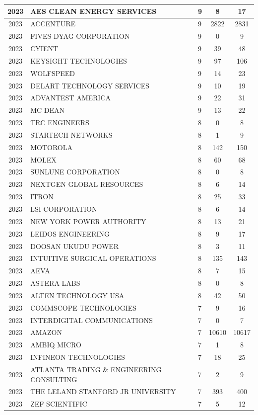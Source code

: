 \documentclass{article}%
\begin{document}
\begin{longtable}{c|p{20em}|p{5em}|c|c}
\hline%
2023&AES CLEAN ENERGY SERVICES&9&8&17\\%
\hline%
2023&ACCENTURE&9&2822&2831\\%
\hline%
2023&FIVES DYAG CORPORATION&9&0&9\\%
\hline%
2023&CYIENT&9&39&48\\%
\hline%
2023&KEYSIGHT TECHNOLOGIES&9&97&106\\%
\hline%
2023&WOLFSPEED&9&14&23\\%
\hline%
2023&DELART TECHNOLOGY SERVICES&9&10&19\\%
\hline%
2023&ADVANTEST AMERICA&9&22&31\\%
\hline%
2023&MC DEAN&9&13&22\\%
\hline%
2023&TRC ENGINEERS&8&0&8\\%
\hline%
2023&STARTECH NETWORKS&8&1&9\\%
\hline%
2023&MOTOROLA&8&142&150\\%
\hline%
2023&MOLEX&8&60&68\\%
\hline%
2023&SUNLUNE CORPORATION&8&0&8\\%
\hline%
2023&NEXTGEN GLOBAL RESOURCES&8&6&14\\%
\hline%
2023&ITRON&8&25&33\\%
\hline%
2023&LSI CORPORATION&8&6&14\\%
\hline%
2023&NEW YORK POWER AUTHORITY&8&13&21\\%
\hline%
2023&LEIDOS ENGINEERING&8&9&17\\%
\hline%
2023&DOOSAN UKUDU POWER&8&3&11\\%
\hline%
2023&INTUITIVE SURGICAL OPERATIONS&8&135&143\\%
\hline%
2023&AEVA&8&7&15\\%
\hline%
2023&ASTERA LABS&8&0&8\\%
\hline%
2023&ALTEN TECHNOLOGY USA&8&42&50\\%
\hline%
2023&COMMSCOPE TECHNOLOGIES&7&9&16\\%
\hline%
2023&INTERDIGITAL COMMUNICATIONS&7&0&7\\%
\hline%
2023&AMAZON&7&10610&10617\\%
\hline%
2023&AMBIQ MICRO&7&1&8\\%
\hline%
2023&INFINEON TECHNOLOGIES&7&18&25\\%
\hline%
2023&ATLANTA TRADING \& ENGINEERING CONSULTING&7&2&9\\%
\hline%
2023&THE LELAND STANFORD JR UNIVERSITY&7&393&400\\%
\hline%
2023&ZEF SCIENTIFIC&7&5&12\\%

\end{longtable}
\end{document}
